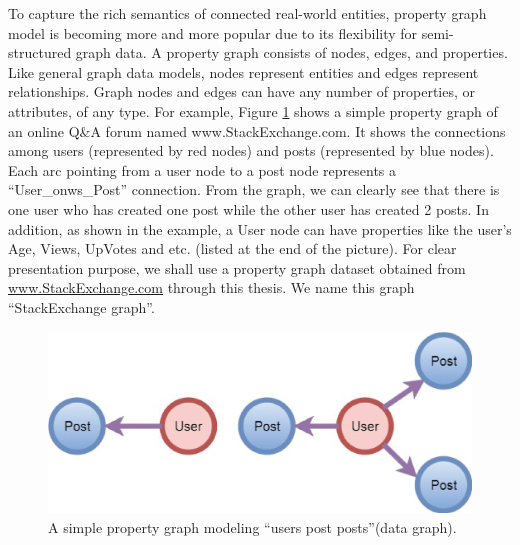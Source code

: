 To capture the rich semantics of connected real-world entities, property graph model \cite{DBLP:conf/mtsr/Tomaszuk16} is becoming more and more popular due to its flexibility for semi-structured graph data. A property graph consists of nodes, edges, and properties. Like general graph data models, nodes represent entities and edges represent relationships. Graph nodes and edges can have any number of properties, or attributes, of any type. For example, Figure \ref{fig:1} shows a simple property graph of an online Q\&A forum named www.StackExchange.com. It shows the connections among users (represented by red nodes) and posts (represented by blue nodes). Each arc pointing from a user node  to a post node represents a ``User\_onws\_Post'' connection. From the graph, we can clearly see that  there is one user who has created one post while the other user has created 2 posts. In addition, as shown in the example, a User node can have properties like the user’s Age, Views, UpVotes and etc. (listed at the end of the picture).
For clear presentation purpose, we shall use a property graph dataset obtained from \url{www.StackExchange.com} through this thesis. We name this graph ``StackExchange graph''.


\begin{figure}
	\centering
	\includegraphics[scale=0.4]{pic/11.eps}
	\caption{A simple property graph modeling ``users post posts''(data graph).}
	\label{fig:1}
\end{figure}






